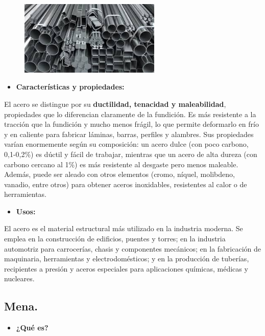 \documentclass[12pt,a4paper]{article}
\begin{document}
\begin{figure}[H]    
    \centering         
    \includegraphics[width=0.6\textwidth]{Inagenes para latex/Acero.jpeg}
\end{figure}
\begin{itemize}
    \item \textbf{Características y propiedades:} 
\end{itemize}

El acero se distingue por su \textbf{ductilidad, tenacidad y maleabilidad}, propiedades que lo diferencian claramente de la fundición. Es más resistente a la tracción que la fundición y mucho menos frágil, lo que permite deformarlo en frío y en caliente para fabricar láminas, barras, perfiles y alambres. Sus propiedades varían enormemente según su composición: un acero dulce (con poco carbono, 0,1-0,2\%) es dúctil y fácil de trabajar, mientras que un acero de alta dureza (con carbono cercano al 1\%) es más resistente al desgaste pero menos maleable. Además, puede ser aleado con otros elementos (cromo, níquel, molibdeno, vanadio, entre otros) para obtener aceros inoxidables, resistentes al calor o de herramientas.

\begin{itemize}
    \item \textbf{Usos:}
\end{itemize}

El acero es el material estructural más utilizado en la industria moderna. Se emplea en la construcción de edificios, puentes y torres; en la industria automotriz para carrocerías, chasis y componentes mecánicos; en la fabricación de maquinaria, herramientas y electrodomésticos; y en la producción de tuberías, recipientes a presión y aceros especiales para aplicaciones químicas, médicas y nucleares.

\subsection{Mena.}
\begin{itemize}
    \item \textbf{¿Qué es?}
\end{itemize}
\end{document}
